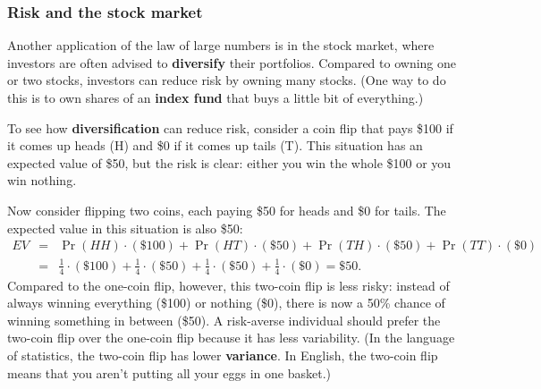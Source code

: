 \subsubsection{Risk and the stock market}

Another application of the law of large numbers is in the stock market, where investors are often advised to \textbf{diversify} their portfolios. Compared to owning one or two stocks, investors can reduce risk by owning many stocks. (One way to do this is to own shares of an \textbf{index fund} that buys a little bit of everything.)

To see how \textbf{diversification} can reduce risk, consider a coin flip that pays \$100 if it comes up heads (H) and \$0 if it comes up tails (T). This situation has an expected value of \$50, but the risk is clear: either you win the whole \$100 or you win nothing.

\begin{comment}
The expected value from this coin flip is
\begin{eqnarray*}
EV & = & \Pr(H) \cdot (\$100) + \Pr(T) \cdot (\$0) \\
& = & \frac{1}{2}\cdot (\$100) + \frac{1}{2} \cdot (\$0) \\
& = & \$50.
\end{eqnarray*}
\end{comment}



Now consider flipping two coins, each paying \$50 for heads and \$0 for tails. The expected value in this situation is also \$50:
\begin{eqnarray*}
EV & = & \Pr(HH) \cdot (\$100) + \Pr(HT) \cdot (\$50) + \Pr(TH) \cdot (\$50) + \Pr(TT) \cdot (\$0) \\
& = & \frac{1}{4}\cdot (\$100) + \frac{1}{4}\cdot (\$50) + \frac{1}{4}\cdot (\$50) + \frac{1}{4} \cdot (\$0) = \$50.
\end{eqnarray*}
Compared to the one-coin flip, however, this two-coin flip is less risky: instead of always winning everything (\$100) or nothing (\$0), there is now a 50\% chance of winning something in between (\$50). A risk-averse individual should prefer the two-coin flip over the one-coin flip because it has less variability. (In the language of statistics, the two-coin flip has lower \textbf{variance}. In English, the two-coin flip means that you aren't putting all your eggs in one basket.)

